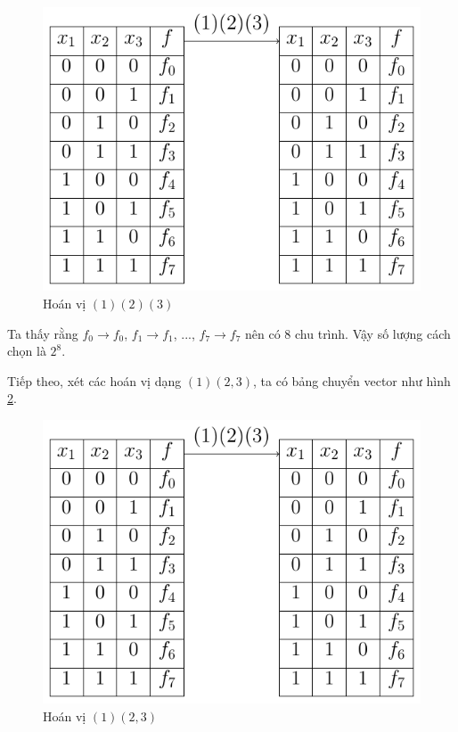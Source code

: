 \begin{figure}[ht]
    \centering
    \includegraphics[page=1]{figures/burnside.pdf}
    \caption{Hoán vị $(1)(2)(3)$}
    \label{burnside:first}
\end{figure}

Ta thấy rằng $f_0 \to f_0$, $f_1 \to f_1$, ..., $f_7 \to f_7$ nên có 8 chu trình. Vậy số lượng cách chọn là $2^8$.

Tiếp theo, xét các hoán vị dạng $(1)(2, 3)$, ta có bảng chuyển vector như hình \ref{burnside:second}.

\begin{figure}[ht]
    \centering
    \includegraphics[page=2]{figures/burnside.pdf}
    \caption{Hoán vị $(1)(2, 3)$}
    \label{burnside:second}
\end{figure}


